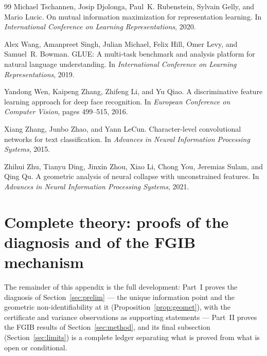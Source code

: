 \documentclass{article} %
\begin{document}
\begin{thebibliography}{99}
Michael Tschannen, Josip Djolonga, Paul~K. Rubenstein, Sylvain Gelly, and Mario Lucic.
\newblock On mutual information maximization for representation learning.
\newblock In \emph{International Conference on Learning Representations}, 2020.

Alex Wang, Amanpreet Singh, Julian Michael, Felix Hill, Omer Levy, and Samuel~R. Bowman.
\newblock GLUE: A multi-task benchmark and analysis platform for natural language
  understanding.
\newblock In \emph{International Conference on Learning Representations}, 2019.

Yandong Wen, Kaipeng Zhang, Zhifeng Li, and Yu Qiao.
\newblock A discriminative feature learning approach for deep face recognition.
\newblock In \emph{European Conference on Computer Vision}, pages 499--515, 2016.

Xiang Zhang, Junbo Zhao, and Yann LeCun.
\newblock Character-level convolutional networks for text classification.
\newblock In \emph{Advances in Neural Information Processing Systems}, 2015.

Zhihui Zhu, Tianyu Ding, Jinxin Zhou, Xiao Li, Chong You, Jeremias Sulam, and Qing Qu.
\newblock A geometric analysis of neural collapse with unconstrained features.
\newblock In \emph{Advances in Neural Information Processing Systems}, 2021.

\end{thebibliography}

\appendix

\section{Complete theory: proofs of the diagnosis and of the FGIB mechanism}
\label{app:theory}

The remainder of this appendix is the full development: Part~I proves the diagnosis of
Section~\ref{sec:prelim} --- the unique information point and the geometric
non-identifiability at it (Proposition~\ref{prop:geomet}), with the certificate and
variance observations as supporting statements --- Part~II proves the FGIB results of
Section~\ref{sec:method}, and its final subsection (Section~\ref{sec:limits}) is a
complete ledger separating what is proved from what is open or conditional.


\end{document}
